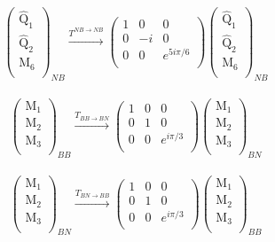 \documentclass[12pt,a4paper]{article}
\newcounter{arrow}
\begin{document}
\begin{align}
\left( \begin{matrix}
\widehat{\text{Q}}_1\\
\widehat{\text{Q}}_2\\
\text{M}_6\\
\end{matrix} \right)_{NB} \xrightarrow{T^{NB \rightarrow NB}}
\left( \begin{matrix}
1 & 0 & 0\\
0 & -i & 0 \\
0 & 0& e^{5i \pi /6} \\
\end{matrix} \right)
\left( \begin{matrix}
\widehat{\text{Q}}_1\\
\widehat{\text{Q}}_2\\
\text{M}_6\\
\end{matrix} \right)_{NB}
\end{align}

\begin{align}
\left( \begin{matrix}
\text{M}_1\\
\text{M}_2\\
\text{M}_3\\
\end{matrix} \right)_{BB} 
\xrightarrow{T_{BB \rightarrow BN}} 
\left(\begin{matrix} 
1 & 0 &0 \\
0 & 1 & 0 \\
0 & 0 & e^{i \pi /3} \\
\end{matrix} \right)
\left( \begin{matrix}
\text{M}_1\\
\text{M}_2\\
\text{M}_3\\
\end{matrix} \right)_{BN}
\end{align}

\begin{align}
\left( \begin{matrix}
\text{M}_1\\
\text{M}_2\\
\text{M}_3\\
\end{matrix} \right)_{BN} 
\xrightarrow{T_{BN \rightarrow BB}} 
\left(\begin{matrix} 
1 & 0 &0 \\
0 & 1 & 0 \\
0 & 0 & e^{i \pi /3} \\
\end{matrix} \right)
\left( \begin{matrix}
\text{M}_1\\
\text{M}_2\\
\text{M}_3\\
\end{matrix} \right)_{BB}
\end{align}
\end{document}
